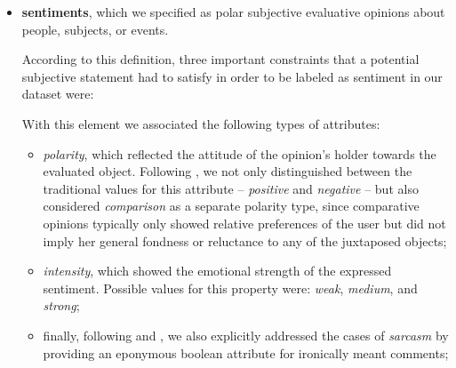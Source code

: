 \begin{itemize}
\item
  \textbf{sentiments}, which we specified as polar subjective
  evaluative opinions about people, subjects, or events.

  According to this definition, three important constraints that a
  potential subjective statement had to satisfy in order to be labeled
  as sentiment in our dataset were:

  With this element we associated the following types of attributes:
  \begin{itemize}
    \item
      \emph{polarity}, which reflected the attitude of the opinion's
      holder towards the evaluated object.  Following
      \citet{Jindal:06a,Jindal:06b}, we not only distinguished between
      the traditional values for this attribute -- \emph{positive} and
      \emph{negative} -- but also considered \emph{comparison} as a
      separate polarity type, since comparative opinions typically
      only showed relative preferences of the user but did not imply
      her general fondness or reluctance to any of the juxtaposed
      objects;
    \item
      \emph{intensity}, which showed the emotional strength of the
      expressed sentiment.  Possible values for this property were:
      \emph{weak}, \emph{medium}, and \emph{strong};
    \item
      finally, following \citet{Bosco:13} and \citet{Rosenthal:14}, we
      also explicitly addressed the cases of \emph{sarcasm} by
      providing an eponymous boolean attribute for ironically meant
      comments;
  \end{itemize}


\end{itemize}
